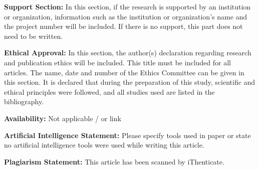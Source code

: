 \documentclass[final, 9pt, onecolumn]{saucis}
\begin{document}
\textbf{Support Section:}
In this section, if the research is supported by an institution or organization, information such as the institution or organization's name and the project number will be included. If there is no support, this part does not need to be written.\vspace{0.2cm}

\textbf{Ethical Approval:}
In this section, the author(s) declaration regarding research and publication ethics will be included. This title must be included for all articles. The name, date and number of the Ethics Committee can be given in this section.
It is declared that during the preparation of this study, scientific and ethical principles were followed, and all studies used are listed in the bibliography.
\vspace{0.2cm}

\textbf{Availability:}
Not applicable / or link
\vspace{0.2cm}

\textbf{Artificial Intelligence Statement:}
Please specify tools used in paper or state no artificial intelligence tools were used while writing this article. 
\vspace{0.2cm}

\textbf{Plagiarism Statement:}
This article has been scanned by iThenticate\texttrademark.
\vspace{0.2cm}




\end{document}
